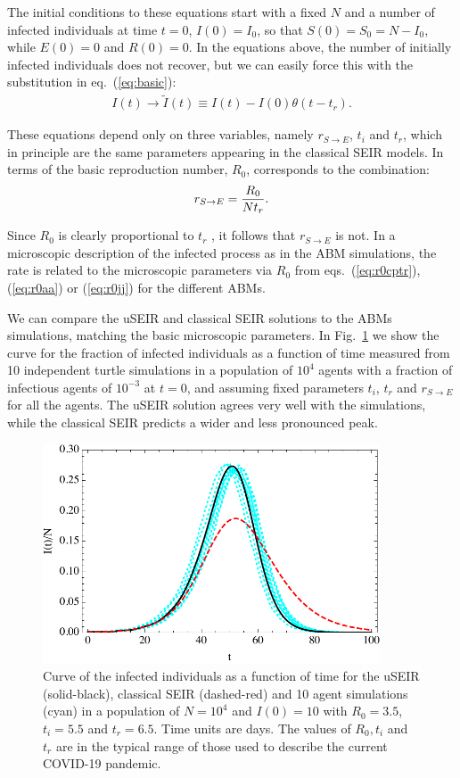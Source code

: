 \documentclass[a4paper,oneside,11pt]{article}
\begin{document}
The initial conditions to these equations start with a fixed $N$ and a number of infected individuals at time $t=0$, $I(0)= I_0$, so that $S(0)=S_0 = N-I_0$, while $E(0)=0$ and $R(0)=0$.
In the  equations above, the number of initially infected individuals does not recover, but we can easily force this with the substitution in eq.~(\ref{eq:basic}):
\begin{eqnarray}
I(t) \rightarrow \tilde{I}(t) \equiv I(t) - I(0) \theta(t-t_r).
\end{eqnarray}

These equations depend only on three variables, namely $r_{S\rightarrow E}$, $t_i$ and $t_r$, which in principle are the same parameters appearing in the classical SEIR models. In terms of the 
basic reproduction number, $R_0$,  corresponds to the combination:
\begin{eqnarray}
r_{S\rightarrow E} = {R_0\over N t_r}.
\end{eqnarray}

Since $R_0$ is clearly proportional to $t_r$ , it follows that $r_{S\rightarrow E}$ is not. In a microscopic description of the infected process as in the ABM simulations, the rate is related to the microscopic parameters via $R_0$ from eqs.~(\ref{eq:r0cptr}), (\ref{eq:r0aa}) or (\ref{eq:r0jj}) for the different ABMs.

  We can compare the uSEIR and classical SEIR solutions to the ABMs simulations, matching the basic microscopic parameters. 
In Fig.~\ref{fig:fixed} we show the curve for the fraction of infected individuals as a function of time measured from 10 independent turtle simulations in a population of $10^4$ agents with a fraction of infectious agents of $10^{-3}$ at $t=0$, and assuming fixed parameters $t_i$, $t_r$ and $r_{S\rightarrow E}$ for all the agents. The uSEIR solution agrees very well with the simulations, while the classical SEIR predicts a wider and less pronounced peak.

\begin{figure}[h!]
  \centering
  \includegraphics[width=10cm]{fixedraw.pdf}
  \caption{ Curve of the infected individuals as a function of time for the uSEIR (solid-black), classical SEIR (dashed-red) and 10 agent simulations (cyan) in a  population of $N=10^4$ and $I(0)=10$ with $R_0=3.5$, $t_i=5.5$ and $t_r=6.5$. Time units are days. The values of $R_0, t_i$ and $t_r$ are in the typical range of those used to describe the
  current COVID-19 pandemic. }
  \label{fig:fixed}
   \end{figure}
\end{document}
